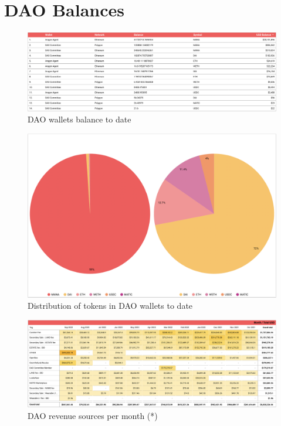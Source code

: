 \documentclass[MSE,Master,english]{twbook}%
\begin{document}
\section{DAO Balances}
\begin{figure}[H]
  \centering
  \includegraphics[width=\textwidth]{metrics/dao_balance.png}
  \caption{DAO wallets balance to date}
  \label{fig:dao_balance}
\end{figure}
\begin{figure}[H]
  \centering
  \includegraphics[width=\textwidth]{metrics/token_distribution.png}
  \caption{Distribution of tokens in DAO wallets to date}
  \label{fig:token_distribution}
\end{figure}
\begin{figure}[H]
  \centering
  \includegraphics[width=\textwidth]{metrics/income.png}
  \caption{DAO revenue sources per month (*)}
  \label{fig:income}
\end{figure}
\end{document}
